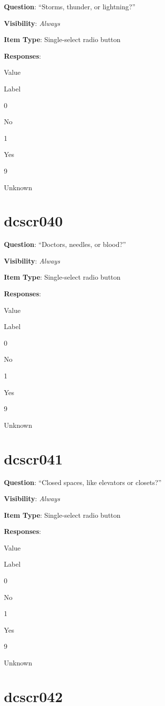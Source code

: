 \documentclass[]{book}
\begin{document}
\textbf{Question}: ``Storms, thunder, or lightning?''

\textbf{Visibility}: \emph{Always}

\textbf{Item Type}: Single-select radio button

\textbf{Responses}:

Value

Label

0

No

1

Yes

9

Unknown

\hypertarget{dcscr040}{%
\section{dcscr040}\label{dcscr040}}

\textbf{Question}: ``Doctors, needles, or blood?''

\textbf{Visibility}: \emph{Always}

\textbf{Item Type}: Single-select radio button

\textbf{Responses}:

Value

Label

0

No

1

Yes

9

Unknown

\hypertarget{dcscr041}{%
\section{dcscr041}\label{dcscr041}}

\textbf{Question}: ``Closed spaces, like elevators or closets?''

\textbf{Visibility}: \emph{Always}

\textbf{Item Type}: Single-select radio button

\textbf{Responses}:

Value

Label

0

No

1

Yes

9

Unknown

\hypertarget{dcscr042}{%
\section{dcscr042}\label{dcscr042}}
\end{document}
